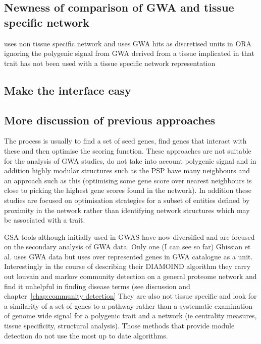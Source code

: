 \subsection{Newness of comparison of GWA and tissue specific network}
\label{sec:comparison with previous studies}
\cite{ghiassian2015disease} uses non tissue specific network and uses GWA hits as discretised units in ORA ignoring the polygenic signal from GWA
derived from a tissue implicated in that trait has not been used with a tissue specific network representation

\subsection{Make the interface easy}
\label{sec:discussion_make_easy}

\subsection{More discussion of previous approaches}
\label{sec:discussion more discussion of previous approaches}
The process is usually to find a set of seed genes, find genes that interact with these and then optimise the scoring function. These approaches are not suitable for the analysis of GWA studies, do not take into account polygenic signal and in addition highly modular structures such as the PSP have many neighbours and an approach such as this (optimising some gene score over nearest neighbours is close to picking the highest gene scores found in the network). In addition these studies are focused on optimisation strategies for a subset of entities defined by proximity in the network rather than identifying network structures which may be associated with a trait.



GSA tools although initially used in GWAS have now diversified and are focused on the secondary analysis of GWA data. Only one (I can see so far) Ghissian  et al.\cite{ghiassian2015disease} uses GWA data but uses over represented genes in GWA catalogue as a unit. Interestingly in the course of describing their DIAMOIND algorithm they carry out louvain and markov community detection on a general proteome network and find it unhelpful in finding disease terms (see discussion and chapter~\ref{chap:community detection} They are also not tissue specific and look for a similarity of a set of genes to a pathway rather than a systematic examination of genome wide signal for a polygenic trait and a network (ie centrality measures, tissue specificity, structural analysis). Those methods that provide module detection do not use the most up to date algorithms.

